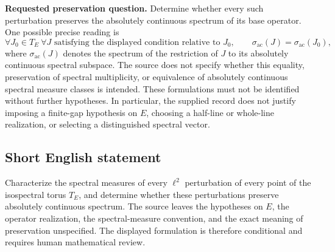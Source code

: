 \documentclass[11pt]{article}
\begin{document}
\textbf{Requested preservation question.} Determine whether every such perturbation preserves the absolutely continuous spectrum of its base operator. One possible precise reading is
\[
 \forall J_0\in T_E\ \forall J\text{ satisfying the displayed condition relative to }J_0,
 \qquad \sigma_{\mathrm{ac}}(J)=\sigma_{\mathrm{ac}}(J_0),
\]
where \(\sigma_{\mathrm{ac}}(J)\) denotes the spectrum of the restriction of \(J\) to its absolutely continuous spectral subspace. The source does not specify whether this equality, preservation of spectral multiplicity, or equivalence of absolutely continuous spectral measure classes is intended. These formulations must not be identified without further hypotheses. In particular, the supplied record does not justify imposing a finite-gap hypothesis on \(E\), choosing a half-line or whole-line realization, or selecting a distinguished spectral vector.
\subsection{Short English statement}
Characterize the spectral measures of every \(\ell^2\) perturbation of every point of the isospectral torus \(T_E\), and determine whether these perturbations preserve absolutely continuous spectrum. The source leaves the hypotheses on \(E\), the operator realization, the spectral-measure convention, and the exact meaning of preservation unspecified. The displayed formulation is therefore conditional and requires human mathematical review.
\end{document}
